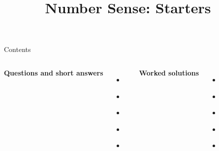 \documentclass{beamer}
\title{Number Sense: Starters}
\author{}
\date{}
\begin{document}
\frame{\titlepage}

\begin{frame}{Contents}
\small
\begin{columns}[T]
\textbf{Questions and short answers}
\begin{itemize}
\item \hyperlink{q-st1}{}
\item \hyperlink{q-st2}{}
\item \hyperlink{q-st3}{}
\item \hyperlink{q-st4}{}
\item \hyperlink{q-st5}{}
\end{itemize}
\textbf{Worked solutions}
\begin{itemize}
\item \hyperlink{work-st1}{}
\item \hyperlink{work-st2}{}
\item \hyperlink{work-st3}{}
\item \hyperlink{work-st4}{}
\item \hyperlink{work-st5}{}
\end{itemize}
\end{columns}
\end{frame}
\end{document}
